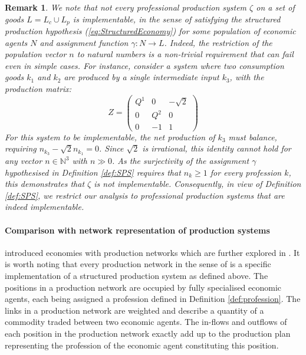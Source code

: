\documentclass[11pt,fleqn]{article}
\newtheorem{remark}[theorem]{Remark}
\begin{document}
\begin{remark}
	We note that not every professional production system $\zeta$ on a set of goods $L = L_c \cup L_p$ is {implementable}, in the sense of satisfying the structured production hypothesis (\ref{eq:StructuredEconomy}) for some population of economic agents $N$ and assignment function $\gamma \colon N \to L$. Indeed, the restriction of the population vector $n$ to natural numbers is a non-trivial requirement that can fail even in simple cases. For instance, consider a system where two consumption goods $k_1$ and $k_2$ are produced by a single intermediate input $k_3$, with the production matrix:
	\[
	Z =
	\begin{pmatrix}
	Q^1 & 0 & - \sqrt{2} \\
	0 & Q^2 & 0 \\
	0 & -1 & 1
	\end{pmatrix}
	\]
	For this system to be implementable, the net production of $k_3$ must balance, requiring $n_{k_3} - \sqrt{2} n_{k_1} = 0$. Since $\sqrt{2}$ is irrational, this identity cannot hold for any vector $n \in \mathbb{N}^3$ with $n \gg 0$. As the surjectivity of the assignment $\gamma$ hypothesised in Definition \ref{def:SPS} requires that $n_k \geqslant 1$ for every profession $k$, this demonstrates that $\zeta$ is not implementable. Consequently, in view of Definition \ref{def:SPS}, we restrict our analysis to professional production systems that are indeed implementable.
\end{remark}


\paragraph{Comparison with network representation of production systems}

\citet{SDL-2} introduced economies with production networks which are further explored in \citet{GillesPesce-SP-3}. It is worth noting that every production network in the sense of \citet{GillesPesce-SP-3} is a specific implementation of a structured production system as defined above. The positions in a production network are occupied by fully specialised economic agents, each being assigned a profession defined in Definition \ref{def:profession}. The links in a production network are weighted and describe a quantity of a commodity traded between two economic agents. The in-flows and outflows of each position in the production network exactly add up to the production plan representing the profession of the economic agent constituting this position. 
\end{document}
